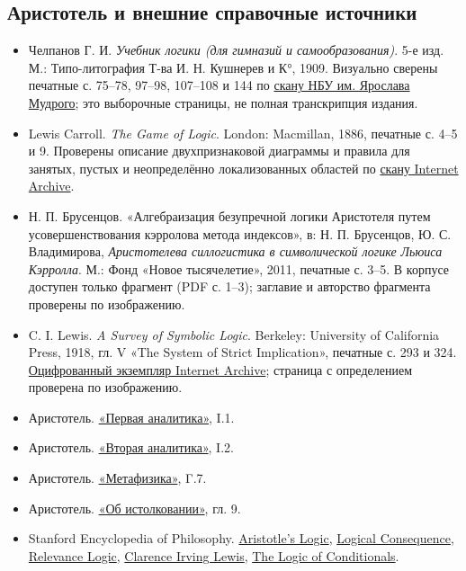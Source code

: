 \documentclass[12pt,a4paper]{article}
\begin{document}
\subsection{Аристотель и внешние справочные источники}

\begin{itemize}
\item Челпанов Г. И. \emph{Учебник логики (для гимназий и самообразования)}. 5-е изд. М.: Типо-литография Т-ва И. Н. Кушнерев и К°, 1909. Визуально сверены печатные с. 75–78, 97–98, 107–108 и 144 по \href{https://web.nlu.org.ua/view.html?id=238}{скану НБУ им. Ярослава Мудрого}; это выборочные страницы, не полная транскрипция издания.
\item Lewis Carroll. \emph{The Game of Logic}. London: Macmillan, 1886, печатные с. 4–5 и 9. Проверены описание двухпризнаковой диаграммы и правила для занятых, пустых и неопределённо локализованных областей по \href{https://archive.org/details/gameoflogic00carrrich}{скану Internet Archive}.
\item Н. П. Брусенцов. «Алгебраизация безупречной логики Аристотеля путем усовершенствования кэрролова метода индексов», в: Н. П. Брусенцов, Ю. С. Владимирова, \emph{Аристотелева силлогистика в символической логике Льюиса Кэрролла}. М.: Фонд «Новое тысячелетие», 2011, печатные с. 3–5. В корпусе доступен только фрагмент (PDF с. 1–3); заглавие и авторство фрагмента проверены по изображению.
\item C. I. Lewis. \emph{A Survey of Symbolic Logic}. Berkeley: University of California Press, 1918, гл. V «The System of Strict Implication», печатные с. 293 и 324. \href{https://archive.org/details/surveyofsymbolic00lewiiala}{Оцифрованный экземпляр Internet Archive}; страница с определением проверена по изображению.
\item Аристотель. \href{https://classics.mit.edu/Aristotle/prior.1.i.html}{«Первая аналитика»}, I.1.
\item Аристотель. \href{https://classics.mit.edu/Aristotle/posterior.1.i.html}{«Вторая аналитика»}, I.2.
\item Аристотель. \href{https://aristotle.johnhboyer.com/Meta/book/4/}{«Метафизика»}, Γ.7.
\item Аристотель. \href{https://www.st-andrews.ac.uk/~mnat/~ball0888/salamis/interpretatione.html}{«Об истолковании»}, гл. 9.
\item Stanford Encyclopedia of Philosophy. \href{https://plato.stanford.edu/entries/aristotle-logic/}{Aristotle’s Logic}, \href{https://plato.stanford.edu/entries/logical-consequence/}{Logical Consequence}, \href{https://plato.stanford.edu/entries/logic-relevance/}{Relevance Logic}, \href{https://plato.stanford.edu/entries/lewis-ci/}{Clarence Irving Lewis}, \href{https://plato.stanford.edu/entries/logic-conditionals/}{The Logic of Conditionals}.

\end{itemize}
\end{document}
